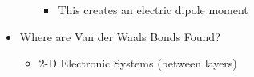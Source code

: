 \begin{itemize}
\begin{itemize}
        \begin{itemize}

          \item This creates an electric dipole moment

        \end{itemize}

    \end{itemize}

  \item Where are Van der Waals Bonds Found?

    \begin{itemize}

      \item 2-D Electronic Systems (between layers)

    \end{itemize}

\end{itemize}



